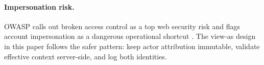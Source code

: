 \paragraph{Impersonation risk.}
OWASP calls out broken access control as a top web security risk and flags account impersonation as a dangerous operational shortcut \cite{owasp_broken_access,owasp_impersonation}. The view-as design in this paper follows the safer pattern: keep actor attribution immutable, validate effective context server-side, and log both identities.
